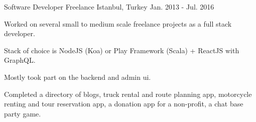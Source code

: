 \begin{cventries}
  \cventry
    {Software Developer}
    {Freelance}
    {Istanbul, Turkey}
    {Jan. 2013 - Jul. 2016}
    {
      \begin{cvitems}
        \item {Worked on several small to medium scale freelance projects as a full stack developer.}
        \item {Stack of choice is NodeJS (Koa) or Play Framework (Scala) + ReactJS with GraphQL.}
        \item {Mostly took part on the backend and admin ui.}
        \item {Completed a directory of blogs, truck rental and route planning app, motorcycle renting and tour reservation app, a donation app for a non-profit, a chat base party game.}
      \end{cvitems}
    }    
    


\end{cventries}
